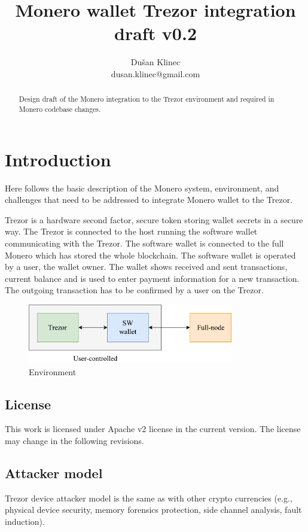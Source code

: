 \documentclass[]{article}
\title{Monero wallet Trezor integration draft v0.2}
\author{Du\v{s}an Klinec \\{dusan.klinec@gmail.com}}
\begin{document}
	
\maketitle

\begin{abstract}
	Design draft of the Monero integration to the Trezor environment and required in Monero codebase changes.
\end{abstract}

\section{Introduction}
Here follows the basic description of the Monero system, environment, and challenges that need to be addressed to integrate Monero wallet to the Trezor.

Trezor is a hardware second factor, secure token storing wallet secrets in a secure way. 
The Trezor is connected to the host running the software wallet communicating with the Trezor. The software wallet is connected to the full Monero which has stored the whole blockchain. The software wallet is operated by a user, the wallet owner. The wallet shows received and sent transactions, current balance and is used to enter payment information for a new transaction. The outgoing transaction has to be confirmed by a user on the Trezor.

\begin{figure}[h]
	\centering
	\includegraphics[width=0.8\textwidth, angle=0]{trezord.pdf}
	\caption{Environment}
\end{figure}


\subsection{License}
This work is licensed under Apache v2 license in the current version. The license may change in the following revisions.

\subsection{Attacker model}

Trezor device attacker model is the same as with other crypto currencies (e.g., physical device security, memory forensics protection, side channel analysis, fault induction).
\end{document}
